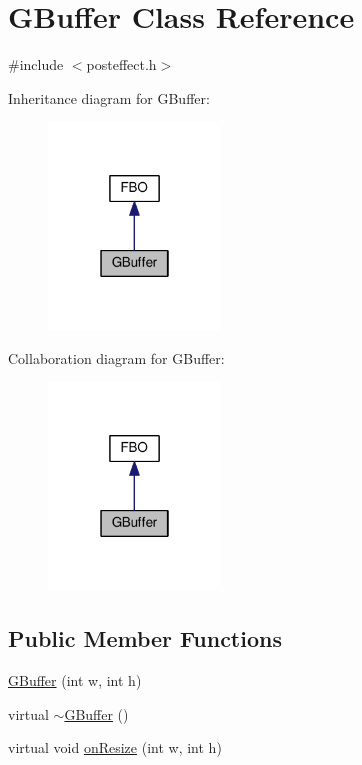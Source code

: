 \hypertarget{class_g_buffer}{}\section{G\+Buffer Class Reference}
\label{class_g_buffer}


{\ttfamily \#include $<$posteffect.\+h$>$}



Inheritance diagram for G\+Buffer\+:
\nopagebreak
\begin{figure}[H]
\begin{center}
\leavevmode
\includegraphics[width=130pt]{class_g_buffer__inherit__graph}
\end{center}
\end{figure}


Collaboration diagram for G\+Buffer\+:
\nopagebreak
\begin{figure}[H]
\begin{center}
\leavevmode
\includegraphics[width=130pt]{class_g_buffer__coll__graph}
\end{center}
\end{figure}
\subsection*{Public Member Functions}
\begin{DoxyCompactItemize}
\item 
\hyperlink{class_g_buffer_a4c29ba745f2ce5250191bccfaa0628a6}{G\+Buffer} (int w, int h)
\item 
virtual \hyperlink{class_g_buffer_ad6bd43b3da5cd99daec3d9bed363e379}{$\sim$\+G\+Buffer} ()
\item 
virtual void \hyperlink{class_g_buffer_a517388b7c86bdad1e85b345647d52c73}{on\+Resize} (int w, int h)
\end{DoxyCompactItemize}

